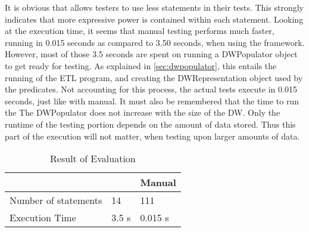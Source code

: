 It is obvious that \FW{} allows testers to use less statements in their tests. This strongly indicates that more expressive power is contained within each statement. Looking at the execution time, it seems that manual testing performs much faster, running in 0.015 seconds as compared to 3.50 seconds, when using the framework. However, most of those 3.5 seconds are spent on running a DWPopulator object to get ready for testing. As explained in \cref{sec:dwpopulator}, this entails the running of the ETL program, and creating the DWRepresentation object used by the predicates. Not accounting for this process, the actual tests execute in 0.015 seconds, just like with manual. It must also be remembered that the time to run the The DWPopulator does not increase with the size of the DW. Only the runtime of the  testing portion depends on the amount of data stored. Thus this part of the execution will not matter, when testing upon larger amounts of data.


\begin{table}[h]
\centering
\caption{Result of Evaluation}
\label{table:result}
\begin{tabular}{|p{}|p{}|p{}|}
\hline
												& \FW{}	 	& Manual				 \\ \hline

Number of statements  & 14 			& 111 \\ \hline
Execution Time				& 3.5 s   & 0.015 s   \\ \hline
\end{tabular}
\end{table}







